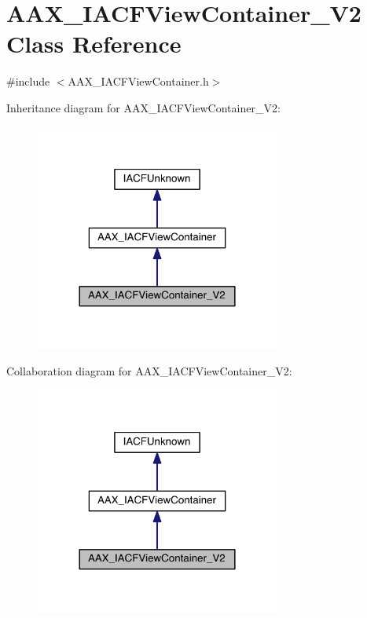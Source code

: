 \hypertarget{a00085}{}\section{A\+A\+X\+\_\+\+I\+A\+C\+F\+View\+Container\+\_\+\+V2 Class Reference}
\label{a00085}


{\ttfamily \#include $<$A\+A\+X\+\_\+\+I\+A\+C\+F\+View\+Container.\+h$>$}



Inheritance diagram for A\+A\+X\+\_\+\+I\+A\+C\+F\+View\+Container\+\_\+\+V2\+:
\nopagebreak
\begin{figure}[H]
\begin{center}
\leavevmode
\includegraphics[width=228pt]{a00598}
\end{center}
\end{figure}


Collaboration diagram for A\+A\+X\+\_\+\+I\+A\+C\+F\+View\+Container\+\_\+\+V2\+:
\nopagebreak
\begin{figure}[H]
\begin{center}
\leavevmode
\includegraphics[width=228pt]{a00599}
\end{center}
\end{figure}


